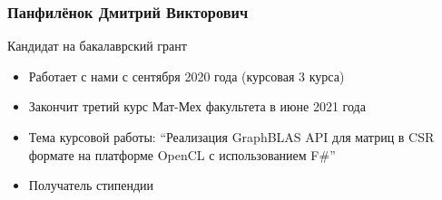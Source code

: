 \documentclass[xcolor=table,aspectratio=169]{beamer}
\begin{document}
\begin{frame}[fragile] \frametitle{Панфилёнок Дмитрий Викторович}
      \begin{minipage}[m]{0.45\linewidth}
  \end{minipage}\hfill
  \begin{minipage}[m]{0.54\linewidth}
  \vspace{-2cm}
  Кандидат на бакалаврский грант

  \begin{itemize}
        \item Работает с нами с сентября 2020 года (курсовая 3 курса)
        \item Закончит третий курс Мат-Мех факультета в июне 2021 года
        \item Тема курсовой работы: ``Реализация GraphBLAS API для матриц в CSR формате на платформе OpenCL с использованием F\#''
        \item Получатель стипендии
  \end{itemize}
  \end{minipage}

\end{frame}
\end{document}
